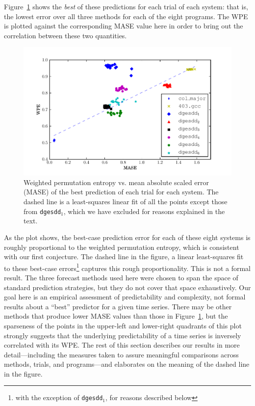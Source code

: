 Figure~\ref{fig:wpe_vs_mase_best} shows the \emph{best} of these predictions for
each trial of each system: that is, the lowest error over all three methods for
each of the eight programs.  The WPE is plotted against the corresponding MASE
value here in order to bring out the correlation between these two quantities.
\begin{figure}[htbp]
  \centering
  \includegraphics[width=\columnwidth]{figs/new_prediction_vs_entropy}
  \caption{Weighted permutation entropy vs. mean absolute scaled error
    (MASE) of the best prediction of each trial for each system.
%
%
The dashed line is a least-squares linear fit of all the points except those
from {\tt dgesdd$_1$}, which we have excluded for reasons explained in the
text.}
  \label{fig:wpe_vs_mase_best}
\end{figure}
As the plot shows, the best-case prediction error for each of these
eight systems is roughly proportional to the weighted permutation
entropy, which is consistent with our first conjecture.  The dashed
line in the figure, a linear least-squares fit to these best-case
errors\footnote{with the exception of {\tt dgesdd$_1$}, for reasons
  described below} captures this rough proportionality.  This is not a
formal result.  The three forecast methods used here were chosen to
span the space of standard prediction strategies, but they do not
cover that space exhaustively.  Our goal here is an empirical
assessment of predictability and complexity, not formal results about
a ``best'' predictor for a given time series.  There may be other
methods that produce lower MASE values than those in
Figure~\ref{fig:wpe_vs_mase_best}, but the sparseness of the points in
the upper-left and lower-right quadrants of this plot strongly
suggests that the underlying predictability of a time series is
inversely correlated with its WPE.  The rest of this section describes
our results in more detail---including the measures taken to assure
meaningful comparisons across methods, trials, and programs---and
elaborates on the meaning of the dashed line in the figure.

